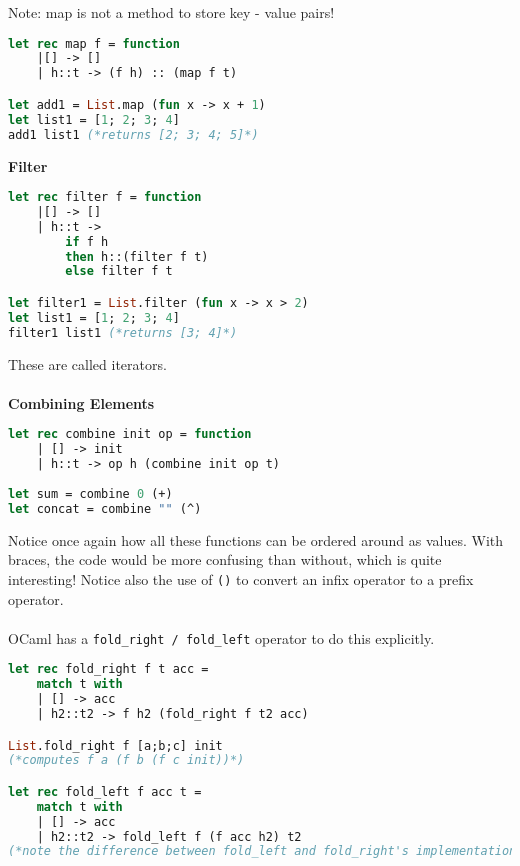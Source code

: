 \documentclass[12pt,a4paper]{article} %
\begin{document}
Note: map is not a method to store key - value pairs!
\begin{lstlisting}[language=Caml]
let rec map f = function
	|[] -> []
	| h::t -> (f h) :: (map f t)

let add1 = List.map (fun x -> x + 1)
let list1 = [1; 2; 3; 4]
add1 list1 (*returns [2; 3; 4; 5]*)
\end{lstlisting}
\textbf{Filter}
\begin{lstlisting}[language=Caml]
let rec filter f = function
	|[] -> []
	| h::t -> 
		if f h
		then h::(filter f t)
		else filter f t

let filter1 = List.filter (fun x -> x > 2)
let list1 = [1; 2; 3; 4]
filter1 list1 (*returns [3; 4]*)
\end{lstlisting}
These are called iterators.
\\\\
\textbf{Combining Elements}
\begin{lstlisting}[language=Caml]
let rec combine init op = function
	| [] -> init
	| h::t -> op h (combine init op t)
	
let sum = combine 0 (+)
let concat = combine "" (^)
\end{lstlisting}
Notice once again how all these functions can be ordered around as values. With braces, the code would be more confusing than without, which is quite interesting! Notice also the use of \verb|()| to convert an infix operator to a prefix operator.
\\\\
OCaml has a \verb|fold_right / fold_left| operator to do this explicitly.
\begin{lstlisting}[language=Caml]
let rec fold_right f t acc =
	match t with
	| [] -> acc
	| h2::t2 -> f h2 (fold_right f t2 acc)

List.fold_right f [a;b;c] init
(*computes f a (f b (f c init))*)

let rec fold_left f acc t =
	match t with
	| [] -> acc
	| h2::t2 -> fold_left f (f acc h2) t2
(*note the difference between fold_left and fold_right's implementation - fold_right has to reach the rightmost element before evaluating f but fold_left evaluates the left-most element straight away*)
\end{lstlisting}
\end{document}
